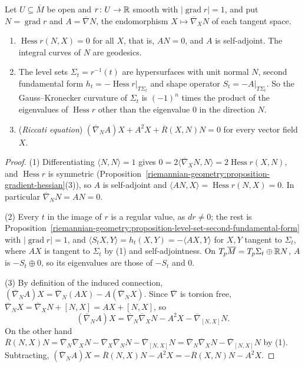 \begin{proposition}\label{riemannian-geometry:proposition-distance-function}
Let $U \subseteq \overline{M}$ be open and $r \colon U \to \mathbb{R}$ smooth with $|\operatorname{grad}r| = 1$, and put $N = \operatorname{grad}r$ and $A = \overline{\nabla}N$, the endomorphism $X \mapsto \overline{\nabla}_XN$ of each tangent space.
\begin{enumerate}
\item $\operatorname{Hess}r(N, X) = 0$ for all $X$, that is, $AN = 0$, and $A$ is self-adjoint. The integral curves of $N$ are geodesics.
\item The level sets $\Sigma_t = r^{-1}(t)$ are hypersurfaces with unit normal $N$, second fundamental form $h_t = -\operatorname{Hess}r|_{T\Sigma_t}$ and shape operator $S_t = -A|_{T\Sigma_t}$. So the Gauss--Kronecker
curvature of $\Sigma_t$ is $(-1)^n$ times the product of the eigenvalues of $\operatorname{Hess}r$ other than the eigenvalue $0$ in the direction $N$.
\item (\emph{Riccati equation}) $(\overline{\nabla}_NA)X + A^2X + \overline{R}(X, N)N = 0$ for every vector field $X$.
\end{enumerate}
\end{proposition}

\begin{proof}
(1) Differentiating $\langle N, N\rangle = 1$ gives $0 = 2\langle\overline{\nabla}_XN, N\rangle = 2\operatorname{Hess}r(X, N)$, and $\operatorname{Hess}r$ is symmetric (Proposition~\ref{riemannian-geometry:proposition-gradient-hessian}(3)), so $A$ is
self-adjoint and $\langle AN, X\rangle = \operatorname{Hess}r(N, X) = 0$. In particular $\overline{\nabla}_NN = AN = 0$.

(2) Every $t$ in the image of $r$ is a regular value, as $dr \neq 0$; the rest is Proposition~\ref{riemannian-geometry:proposition-level-set-second-fundamental-form} with $|\operatorname{grad}r| = 1$, and
$\langle S_tX, Y\rangle = h_t(X, Y) = -\langle AX, Y\rangle$ for $X, Y$ tangent to $\Sigma_t$, where $AX$ is tangent to $\Sigma_t$ by (1) and self-adjointness. On $T_p\overline{M} = T_p\Sigma_t \oplus \mathbb{R} N$, $A$ is
$-S_t \oplus 0$, so its eigenvalues are those of $-S_t$ and $0$.

(3) By definition of the induced connection, $(\overline{\nabla}_NA)X = \overline{\nabla}_N(AX) - A(\overline{\nabla}_NX)$. Since $\overline{\nabla}$ is torsion free, $\overline{\nabla}_NX = \overline{\nabla}_XN + [N, X] = AX + [N, X]$, so
\[
(\overline{\nabla}_NA)X = \overline{\nabla}_N\overline{\nabla}_XN - A^2X - \overline{\nabla}_{[N, X]}N .
\]
On the other hand $\overline{R}(N, X)N = \overline{\nabla}_N\overline{\nabla}_XN - \overline{\nabla}_X\overline{\nabla}_NN - \overline{\nabla}_{[N, X]}N = \overline{\nabla}_N\overline{\nabla}_XN - \overline{\nabla}_{[N, X]}N$ by (1).
Subtracting, $(\overline{\nabla}_NA)X = \overline{R}(N, X)N - A^2X = -\overline{R}(X, N)N - A^2X$.
\end{proof}


